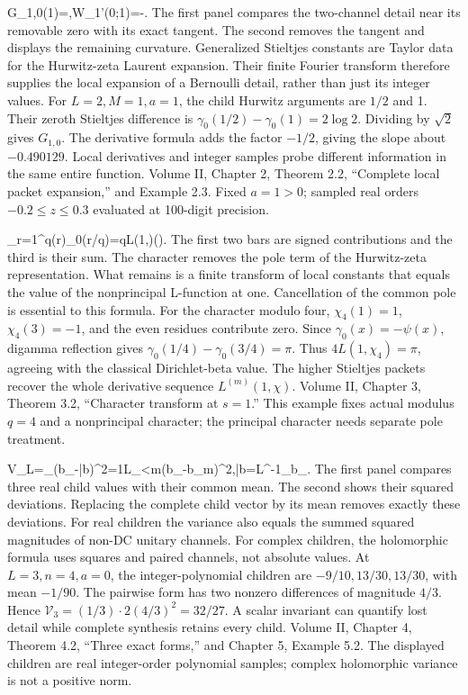 {G_{1,0}(1)=,\qquad W_1'(0;1)=-.}
{The first panel compares the two-channel detail near its removable zero with its exact tangent. The second removes the tangent and displays the remaining curvature. Generalized Stieltjes constants are Taylor data for the Hurwitz-zeta Laurent expansion. Their finite Fourier transform therefore supplies the local expansion of a Bernoulli detail, rather than just its integer values.}
{For $L=2,M=1,a=1$, the child Hurwitz arguments are $1/2$ and 1. Their zeroth Stieltjes difference is $\gamma_0(1/2)-\gamma_0(1)=2\log2$. Dividing by $\sqrt2$ gives $G_{1,0}$. The derivative formula adds the factor $-1/2$, giving the slope about $-0.490129$.}
{Local derivatives and integer samples probe different information in the same entire function.}
{Volume II, Chapter 2, Theorem 2.2, ``Complete local packet expansion,'' and Example 2.3. Fixed $a=1>0$; sampled real orders $-0.2\le z\le0.3$ evaluated at 100-digit precision.}

{\sum_{r=1}^{q}\chi(r)\gamma_0(r/q)=qL(1,\chi)\qquad(\chi{}).}
{The first two bars are signed contributions and the third is their sum. The character removes the pole term of the Hurwitz-zeta representation. What remains is a finite transform of local constants that equals the value of the nonprincipal L-function at one. Cancellation of the common pole is essential to this formula.}
{For the character modulo four, $\chi_4(1)=1$, $\chi_4(3)=-1$, and the even residues contribute zero. Since $\gamma_0(x)=-\psi(x)$, digamma reflection gives $\gamma_0(1/4)-\gamma_0(3/4)=\pi$. Thus $4L(1,\chi_4)=\pi$, agreeing with the classical Dirichlet-beta value.}
{The higher Stieltjes packets recover the whole derivative sequence $L^{(m)}(1,\chi)$.}
{Volume II, Chapter 3, Theorem 3.2, ``Character transform at $s=1$.'' This example fixes actual modulus $q=4$ and a nonprincipal character; the principal character needs separate pole treatment.}

{\mathcal V_L=\sum_\ell(b_\ell-\bar b)^2=\frac1L\sum_{\ell<m}(b_\ell-b_m)^2,\quad \bar b=L^{-1}\sum_\ell b_\ell.}
{The first panel compares three real child values with their common mean. The second shows their squared deviations. Replacing the complete child vector by its mean removes exactly these deviations. For real children the variance also equals the summed squared magnitudes of non-DC unitary channels. For complex children, the holomorphic formula uses squares and paired channels, not absolute values.}
{At $L=3,n=4,a=0$, the integer-polynomial children are $-9/10,13/30,13/30$, with mean $-1/90$. The pairwise form has two nonzero differences of magnitude $4/3$. Hence $\mathcal V_3=(1/3)\cdot2(4/3)^2=32/27$.}
{A scalar invariant can quantify lost detail while complete synthesis retains every child.}
{Volume II, Chapter 4, Theorem 4.2, ``Three exact forms,'' and Chapter 5, Example 5.2. The displayed children are real integer-order polynomial samples; complex holomorphic variance is not a positive norm.}

